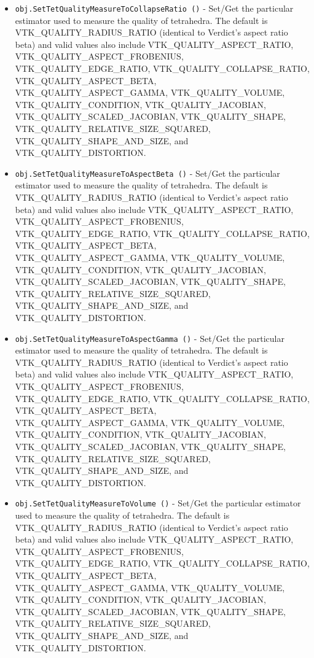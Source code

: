 \begin{itemize}
\item  \verb|obj.SetTetQualityMeasureToCollapseRatio ()| -  Set/Get the particular estimator used to measure the quality of tetrahedra.
 The default is VTK\_QUALITY\_RADIUS\_RATIO (identical to Verdict's aspect
 ratio beta) and valid values also include
 VTK\_QUALITY\_ASPECT\_RATIO, VTK\_QUALITY\_ASPECT\_FROBENIUS, VTK\_QUALITY\_EDGE\_RATIO,
 VTK\_QUALITY\_COLLAPSE\_RATIO, VTK\_QUALITY\_ASPECT\_BETA, VTK\_QUALITY\_ASPECT\_GAMMA, 
 VTK\_QUALITY\_VOLUME, VTK\_QUALITY\_CONDITION, VTK\_QUALITY\_JACOBIAN, 
 VTK\_QUALITY\_SCALED\_JACOBIAN, VTK\_QUALITY\_SHAPE, VTK\_QUALITY\_RELATIVE\_SIZE\_SQUARED,
 VTK\_QUALITY\_SHAPE\_AND\_SIZE, and VTK\_QUALITY\_DISTORTION.

\item  \verb|obj.SetTetQualityMeasureToAspectBeta ()| -  Set/Get the particular estimator used to measure the quality of tetrahedra.
 The default is VTK\_QUALITY\_RADIUS\_RATIO (identical to Verdict's aspect
 ratio beta) and valid values also include
 VTK\_QUALITY\_ASPECT\_RATIO, VTK\_QUALITY\_ASPECT\_FROBENIUS, VTK\_QUALITY\_EDGE\_RATIO,
 VTK\_QUALITY\_COLLAPSE\_RATIO, VTK\_QUALITY\_ASPECT\_BETA, VTK\_QUALITY\_ASPECT\_GAMMA, 
 VTK\_QUALITY\_VOLUME, VTK\_QUALITY\_CONDITION, VTK\_QUALITY\_JACOBIAN, 
 VTK\_QUALITY\_SCALED\_JACOBIAN, VTK\_QUALITY\_SHAPE, VTK\_QUALITY\_RELATIVE\_SIZE\_SQUARED,
 VTK\_QUALITY\_SHAPE\_AND\_SIZE, and VTK\_QUALITY\_DISTORTION.

\item  \verb|obj.SetTetQualityMeasureToAspectGamma ()| -  Set/Get the particular estimator used to measure the quality of tetrahedra.
 The default is VTK\_QUALITY\_RADIUS\_RATIO (identical to Verdict's aspect
 ratio beta) and valid values also include
 VTK\_QUALITY\_ASPECT\_RATIO, VTK\_QUALITY\_ASPECT\_FROBENIUS, VTK\_QUALITY\_EDGE\_RATIO,
 VTK\_QUALITY\_COLLAPSE\_RATIO, VTK\_QUALITY\_ASPECT\_BETA, VTK\_QUALITY\_ASPECT\_GAMMA, 
 VTK\_QUALITY\_VOLUME, VTK\_QUALITY\_CONDITION, VTK\_QUALITY\_JACOBIAN, 
 VTK\_QUALITY\_SCALED\_JACOBIAN, VTK\_QUALITY\_SHAPE, VTK\_QUALITY\_RELATIVE\_SIZE\_SQUARED,
 VTK\_QUALITY\_SHAPE\_AND\_SIZE, and VTK\_QUALITY\_DISTORTION.

\item  \verb|obj.SetTetQualityMeasureToVolume ()| -  Set/Get the particular estimator used to measure the quality of tetrahedra.
 The default is VTK\_QUALITY\_RADIUS\_RATIO (identical to Verdict's aspect
 ratio beta) and valid values also include
 VTK\_QUALITY\_ASPECT\_RATIO, VTK\_QUALITY\_ASPECT\_FROBENIUS, VTK\_QUALITY\_EDGE\_RATIO,
 VTK\_QUALITY\_COLLAPSE\_RATIO, VTK\_QUALITY\_ASPECT\_BETA, VTK\_QUALITY\_ASPECT\_GAMMA, 
 VTK\_QUALITY\_VOLUME, VTK\_QUALITY\_CONDITION, VTK\_QUALITY\_JACOBIAN, 
 VTK\_QUALITY\_SCALED\_JACOBIAN, VTK\_QUALITY\_SHAPE, VTK\_QUALITY\_RELATIVE\_SIZE\_SQUARED,
 VTK\_QUALITY\_SHAPE\_AND\_SIZE, and VTK\_QUALITY\_DISTORTION.


\end{itemize}
